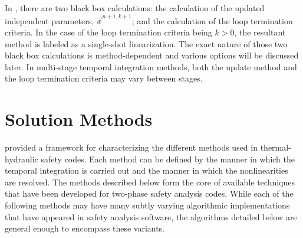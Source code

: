 In , there are two black box calculations: the calculation of the updated independent parameters, $\vec{x}^{n+1,k+1}$; and the calculation of the loop termination criteria.
In the case of the loop termination criteria being $k > 0$, the resultant method is labeled as a single-shot linearization.
The exact nature of those two black box calculations is method-dependent and various options will be discussed later.
In multi-stage temporal integration methods, both the update method and the loop termination criteria may vary between stages. 

\section{Solution Methods}
\label{sect:solution_techniques}

 provided a framework for characterizing the different methods used in thermal-hydraulic safety codes. 
Each method can be defined by the manner in which the temporal integration is carried out and the manner in which the nonlinearities are resolved.
The methods described below form the core of available techniques that have been developed for two-phase safety analysis codes. 
While each of the following methods may have many subtly varying algorithmic implementations that have appeared in safety analysis software, the algorithms detailed below are general enough to encompass these variants.

